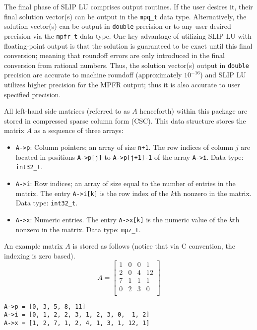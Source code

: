 \documentclass[12pt]{article}
\theoremstyle{definition}
\begin{document}
The final phase of SLIP LU comprises output routines. If the user desires it,
their final solution vector(s) can be output in the \verb|mpq_t| data type.
Alternatively, the solution vector(s) can be output in \verb|double| precision
or to any user desired precision via the \verb|mpfr_t| data type. One key
advantage of utilizing SLIP LU with floating-point output is that the solution
is guaranteed to be exact until this final conversion; meaning that roundoff
errors are only introduced in the final conversion from rational numbers. Thus,
the solution vector(s) output in \verb|double| precision are accurate to machine
roundoff (approximately $10^{-16}$) and SLIP LU utilizes higher precision for
the MPFR output; thus it is also accurate to user specified precision.

All left-hand side matrices (referred to as $A$ henceforth) within this package
are stored in compressed sparse column form (CSC). This data structure
stores the matrix $A$ as a sequence of three arrays:

\begin{itemize}
\item
\verb|A->p|: Column pointers; an array of size \verb|n+1|. The row indices of
column $j$ are located in positions \verb|A->p[j]| to \verb|A->p[j+1]-1| of the
array \verb|A->i|. Data type: \verb|int32_t|.

\item
\verb|A->i|: Row indices; an array of size equal to the number of entries in
the matrix. The entry \verb|A->i[k]| is the row index of the $k$th nonzero in
the matrix. Data type: \verb|int32_t|.

\item
\verb|A->x|: Numeric entries. The entry \verb|A->x[k]| is the numeric value of
the $k$th nonzero in the matrix. Data type: \verb|mpz_t|.
\end{itemize}

An example matrix $A$ is stored as follows (notice that via C convention, the
indexing is zero based).
\[
A = \begin{bmatrix}
1 & 0 & 0 & 1 \\
2 & 0 & 4 & 12 \\
7 & 1 & 1 & 1 \\
0 & 2 & 3 & 0 \\
\end{bmatrix}
\]

{\small
\noindent \verb|A->p = [0, 3, 5, 8, 11]| \\
\verb|A->i = [0, 1, 2, 2, 3, 1, 2, 3, 0,  1, 2]| \\
\verb|A->x = [1, 2, 7, 1, 2, 4, 1, 3, 1, 12, 1]|
}
\end{document}
